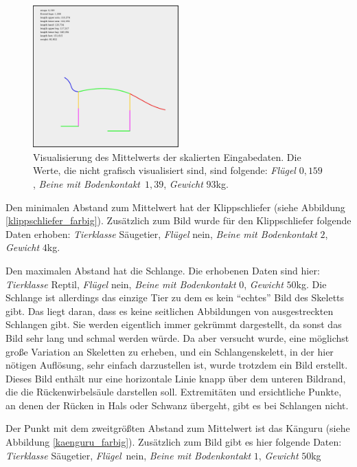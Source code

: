  \begin{figure}
  \centering
  \includegraphics[width=0.5\textwidth]{../PCA/mean_log_weight_downscaled_wings_legs_and_weight(onlyBox,stroke4).jpg}
  \caption{Visualisierung des Mittelwerts der skalierten Eingabedaten. Die Werte, die nicht grafisch visualisiert sind, sind folgende: \emph{Flügel} $0{,}159$, \emph{Beine mit Bodenkontakt}~$1{,}39$, \emph{Gewicht} $93$kg.}
  \label{mean}
 \end{figure}
 
 Den minimalen Abstand zum Mittelwert hat der Klippschliefer (siehe Abbildung \ref{klippschliefer_farbig}). Zusätzlich zum Bild wurde für den Klippschliefer folgende Daten erhoben:
 \emph{Tierklasse} Säugetier, \emph{Flügel} nein, \emph{Beine mit Bodenkontakt} $2$, \emph{Gewicht} $4$kg.
 
 Den maximalen Abstand hat die Schlange. Die erhobenen Daten sind hier:
 \emph{Tierklasse} Reptil, \emph{Flügel} nein, \emph{Beine mit Bodenkontakt} $0$, \emph{Gewicht} $50$kg.
 Die Schlange ist allerdings das einzige Tier zu dem es kein "`echtes"' Bild des Skeletts gibt. Das liegt daran, dass es keine seitlichen Abbildungen von ausgestreckten Schlangen gibt. Sie werden eigentlich immer gekrümmt dargestellt, da sonst das Bild sehr lang und schmal werden würde. 
 Da aber versucht wurde, eine möglichst große Variation an Skeletten zu erheben, und ein Schlangenskelett, in der hier nötigen Auflösung, sehr einfach darzustellen ist, wurde trotzdem ein Bild erstellt. Dieses Bild enthält nur eine horizontale Linie knapp über dem unteren Bildrand, die die Rückenwirbelsäule darstellen soll. Extremitäten und ersichtliche Punkte, an denen der Rücken in Hals oder Schwanz übergeht, gibt es bei Schlangen nicht.
 
 Der Punkt mit dem zweitgrößten Abstand zum Mittelwert ist das Känguru (siehe Abbildung \ref{kaenguru_farbig}). Zusätzlich zum Bild gibt es hier folgende Daten:
  \emph{Tierklasse} Säugetier, \emph{Flügel}~nein, \emph{Beine mit Bodenkontakt} $1$, \emph{Gewicht} $50$kg
  
